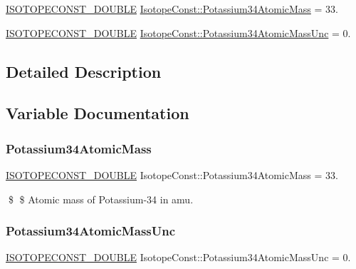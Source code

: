 \begin{DoxyCompactItemize}
\item 
\mbox{\hyperlink{group___isotope_const-_macros_ga8f45a7272ce02c0b4c65c44636ed719a}{I\+S\+O\+T\+O\+P\+E\+C\+O\+N\+S\+T\+\_\+\+D\+O\+U\+B\+LE}} \mbox{\hyperlink{group___isotope_const-_potassium-_k34_ga6e1093995803cad6f30e43f1af7b8209}{Isotope\+Const\+::\+Potassium34\+Atomic\+Mass}} = 33.
\item 
\mbox{\hyperlink{group___isotope_const-_macros_ga8f45a7272ce02c0b4c65c44636ed719a}{I\+S\+O\+T\+O\+P\+E\+C\+O\+N\+S\+T\+\_\+\+D\+O\+U\+B\+LE}} \mbox{\hyperlink{group___isotope_const-_potassium-_k34_gab35b34ea0c0a7a60f55ff99a444370b2}{Isotope\+Const\+::\+Potassium34\+Atomic\+Mass\+Unc}} = 0.
\end{DoxyCompactItemize}


\subsection{Detailed Description}


\subsection{Variable Documentation}
\mbox{\label{group___isotope_const-_potassium-_k34_ga6e1093995803cad6f30e43f1af7b8209}} 
\subsubsection{\texorpdfstring{Potassium34\+Atomic\+Mass}{Potassium34AtomicMass}}
{\footnotesize\ttfamily \mbox{\hyperlink{group___isotope_const-_macros_ga8f45a7272ce02c0b4c65c44636ed719a}{I\+S\+O\+T\+O\+P\+E\+C\+O\+N\+S\+T\+\_\+\+D\+O\+U\+B\+LE}} Isotope\+Const\+::\+Potassium34\+Atomic\+Mass = 33.}

\$ \$ Atomic mass of Potassium-\/34 in amu. \mbox{\label{group___isotope_const-_potassium-_k34_gab35b34ea0c0a7a60f55ff99a444370b2}} 
\subsubsection{\texorpdfstring{Potassium34\+Atomic\+Mass\+Unc}{Potassium34AtomicMassUnc}}
{\footnotesize\ttfamily \mbox{\hyperlink{group___isotope_const-_macros_ga8f45a7272ce02c0b4c65c44636ed719a}{I\+S\+O\+T\+O\+P\+E\+C\+O\+N\+S\+T\+\_\+\+D\+O\+U\+B\+LE}} Isotope\+Const\+::\+Potassium34\+Atomic\+Mass\+Unc = 0.}

